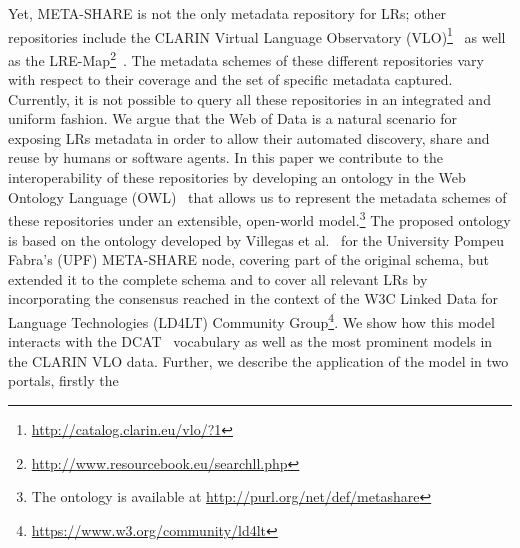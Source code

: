 \documentclass{llncs}
\begin{document}
Yet, META-SHARE is not the only metadata repository for LRs;
other repositories include the CLARIN Virtual Language Observatory
(VLO)\footnote{\url{http://catalog.clarin.eu/vlo/?1}}~\cite{broeder2010data} as
well as the LRE-Map\footnote{\url{http://www.resourcebook.eu/searchll.php}}~\cite{calzolari2012lre}. The metadata schemes of these different repositories vary with respect to their coverage and the set of specific metadata captured.
Currently, it is not possible to query all these repositories in an integrated and uniform fashion.
We argue that the Web of Data is a natural scenario for exposing LRs metadata in order to allow their automated discovery, share and reuse by humans or software agents. %
In this paper we contribute to the interoperability of these repositories by
developing an ontology in the Web Ontology Language (OWL)~\cite{motik2012owl}
that allows us to represent the metadata schemes of these repositories under an
extensible, open-world model.\footnote{The ontology is available at
\url{http://purl.org/net/def/metashare}}
The proposed ontology is based on the ontology developed by Villegas et
al.~\cite{Villegas2014} for the University Pompeu Fabra's (UPF) META-SHARE node, covering part of the original schema, but extended it to the complete schema and to cover all relevant LRs by incorporating the consensus
reached in the context of the W3C Linked Data for Language Technologies (LD4LT) Community Group\footnote{\url{https://www.w3.org/community/ld4lt}}.
We show how this model interacts with the DCAT~\cite{maali2014data} vocabulary
as well as the most prominent models in the CLARIN VLO data.
Further, we describe the application of the model in two portals, firstly the
\end{document}
